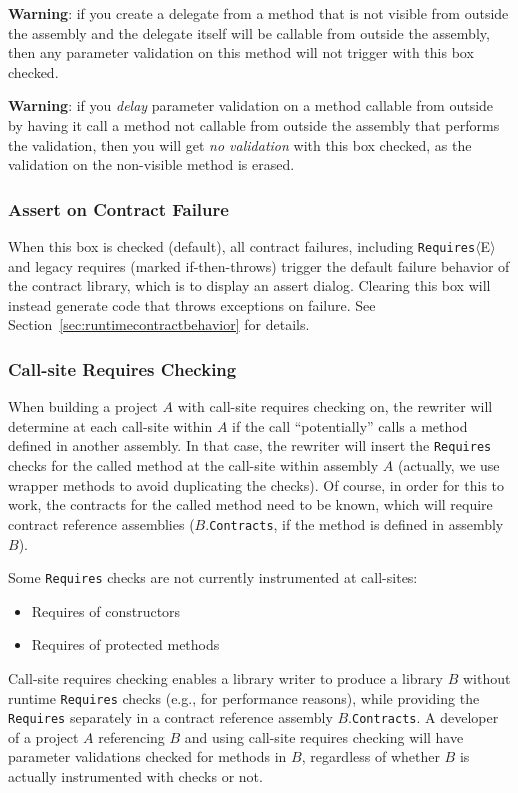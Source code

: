 \documentclass{article}
\newcommand{\code}[1]{\lstinline{#1}}
\newcommand{\requires}[1]{\code{Requires}$\langle$#1$\rangle$}
\begin{document}
\textbf{Warning}: if you create a delegate from a method that is not
visible from outside the assembly and the delegate itself will be
callable from outside the assembly, then any parameter validation on
this method will not trigger with this box checked.

\textbf{Warning}: if you \emph{delay} parameter validation on a method callable
from outside by having it call a method not callable from outside the
assembly that performs the validation, then you will get \emph{no
validation} with this box checked, as the validation on the
non-visible method is erased.

\subsubsection{Assert on Contract Failure}
\noindent
When this box is checked (default), all contract failures, including
\requires{E} and legacy requires (marked if-then-throws) trigger the
default failure behavior of the contract library, which is to display
an assert dialog. Clearing this box will instead generate code that throws
exceptions on failure. See Section~\ref{sec:runtimecontractbehavior}
for details.

\subsubsection{Call-site Requires Checking}
When building a project $A$ with call-site requires checking on, the
rewriter will determine at each call-site within $A$ if the call
``potentially'' calls a method defined in another assembly. In that
case, the rewriter will insert the \code{Requires} checks for the
called method at the call-site within assembly $A$ (actually, we use
wrapper methods to avoid duplicating the checks). Of course, in order
for this to work, the contracts for the called method need to be
known, which will require contract reference assemblies ($B$.\code{Contracts},
if the method is defined in assembly $B$).

\noindent Some \code{Requires} checks are not currently instrumented at
call-sites:
\begin{itemize}
\item Requires of constructors
\item Requires of protected methods
\end{itemize}

\noindent
Call-site requires checking enables a library writer to
produce a library $B$ without runtime \code{Requires} checks (e.g.,
for performance reasons), while providing the \code{Requires}
separately in a contract reference assembly $B$.\code{Contracts}. A
developer of a project $A$ referencing $B$ and using call-site
requires checking will have parameter validations checked for methods
in $B$, regardless of whether $B$ is actually instrumented with checks
or not.
\end{document}
